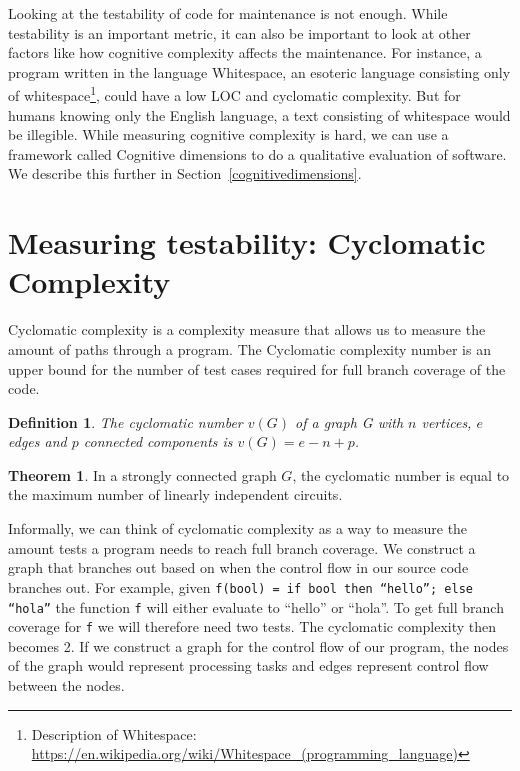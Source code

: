 \documentclass[12pt]{report}
\newtheorem*{definition}{Definition}
\theoremstyle{definition}
\newtheorem*{theorem}{Theorem}
\theoremstyle{theorem}
\begin{document}
Looking at the testability of code for maintenance is not enough. While
testability is an important metric, it can also be important to look at other
factors like how cognitive complexity affects the maintenance. For instance, a
program written in the language Whitespace, an esoteric language consisting only
of whitespace\footnote{Description of Whitespace:
\url{https://en.wikipedia.org/wiki/Whitespace_(programming_language)}}, could
have a low LOC and cyclomatic complexity. But for humans knowing only the
English language, a text consisting of whitespace would be illegible. While
measuring cognitive complexity is hard, we can use a framework called Cognitive
dimensions to do a qualitative evaluation of software. We describe this further
in Section~\ref{cognitivedimensions}.


\section{Measuring testability: Cyclomatic Complexity}\label{cyclomaticcomplexity}

Cyclomatic complexity is a complexity measure that allows us to measure the
amount of paths through a program. The Cyclomatic complexity number is an upper
bound for the number of test cases required for full branch coverage of the
code. 

\theoremstyle{definition}
\begin{definition}
The cyclomatic number $v(G)$ of a graph G with $n$ vertices, $e$ edges and $p$
connected components is $v(G) = e - n + p$.
\end{definition}

\begin{theorem}
In a strongly connected graph $G$, the cyclomatic number is equal to the
maximum number of linearly independent circuits.~\cite{McCabe}
\end{theorem}

Informally, we can think of cyclomatic complexity as a way to measure the amount
tests a program needs to reach full branch coverage. We construct a graph that
branches out based on when the control flow in our source code branches out. For
example, given \texttt{f(bool) = if bool then ``hello''; else ``hola''} the
function \texttt{f} will either evaluate to ``hello'' or ``hola''. To get full
branch coverage for \texttt{f} we will therefore need two tests. The cyclomatic
complexity then becomes 2. If we construct a graph for the control flow of our
program, the nodes of the graph would represent processing tasks and edges
represent control flow between the nodes. 
\end{document}

